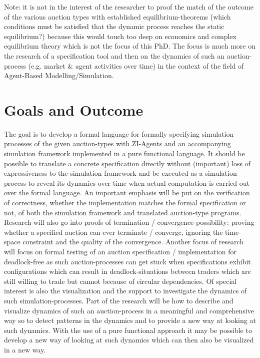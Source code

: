 \documentclass{article}
\begin{document}
Note: it is not in the interest of the researcher to proof the match of the outcome of the various auction types with established equilibrium-theorems (which conditions must be satisfied that the dynamic process reaches the static equilibrium?) because this would touch too deep on economics and complex equilibrium theory which is not the focus of this PhD. The focus is much more on the research of a specification tool and then on the dynamics of such an auction- process (e.g. market \& agent activities over time) in the context of the field of Agent-Based Modelling/Simulation.

 

\section{Goals and Outcome}
The goal is to develop a formal language for formally specifying simulation processes of the given auction-types with ZI-Agents and an accompanying simulation framework implemented in a pure functional language. It should be possible to translate a concrete specification directly without (important) loss of expressiveness to the simulation framework and be executed as a simulation-process to reveal its dynamics over time when actual computation is carried out over the formal language.
An important emphasis will be put on the verification of correctness, whether the implementation matches the formal specification or not, of both the simulation framework and translated auction-type programs.
Research will also go into proofs of termination / convergence-possibility: proving whether a specified auction can ever terminate / converge, ignoring the time-space constraint and the quality of the convergence. Another focus of research will focus on formal testing of an auction specification / implementation for deadlock-free as such auction-processes can get stuck when specifications exhibit configurations which can result in deadlock-situations between traders which are still willing to trade but cannot because of circular dependencies.
Of special interest is also the visualization and the support to investigate the dynamics of such simulation-processes. Part of the research will be how to describe and visualize dynamics of such an auction-process in a meaningful and comprehensive way so to detect patterns in the dynamics and to provide a new way at looking at such dynamics. With the use of a pure functional approach it may be possible to develop a new way of looking at such dynamics which can then also be visualized in a new way.
\end{document}
